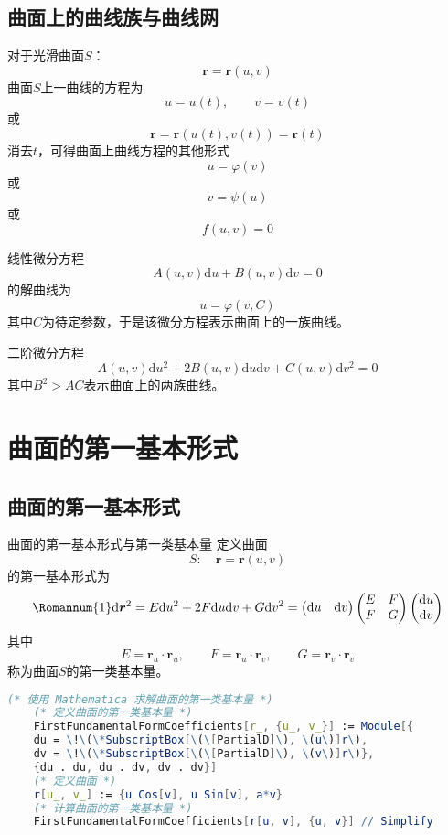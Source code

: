 \documentclass[lang = cn, scheme = chinese, thmcnt = section]{elegantbook}
\newcommand{\bs}{\boldsymbol}          %
\newcommand{\dd}{\mathrm{d}}           %
\begin{document}
\subsection{曲面上的曲线族与曲线网}

对于光滑曲面$S$：%
$$
\bs{r}=\bs{r}(u,v)
$$
曲面$ S $上一曲线的方程为%
$$
u=u(t),\qquad 
v=v(t)
$$
或%
$$
\bs{r}=\bs{r}(u(t),v(t))=\bs{r}(t)
$$
消去$t$，可得曲面上曲线方程的其他形式%
$$
u=\varphi(v)
$$
或%
$$
v=\psi(u)
$$
或%
$$
f(u,v)=0
$$

线性微分方程%
$$
A(u,v)\dd u+B(u,v)\dd v=0
$$
的解曲线为%
$$
u=\varphi(v,C)
$$
其中$C$为待定参数，于是该微分方程表示曲面上的一族曲线。

二阶微分方程%
$$
A(u,v)\dd u^2+2B(u,v)\dd u \dd v+C(u,v)\dd v^2=0
$$
其中$B^2>AC$表示曲面上的两族曲线。

\section{曲面的第一基本形式}

\subsection{曲面的第一基本形式}

\begin{definition}{曲面的第一基本形式与第一类基本量}
	定义曲面
	$$
	S:\quad \bs{r}=\bs{r}(u,v)
	$$
	的第一基本形式为%
	$$
	{\rm\Romannum{1}}
	\dd \bs{r}^2
	=E\dd u^2+2F\dd u\dd v+G\dd v^2=
	\begin{pmatrix}
		\dd u & \dd v
	\end{pmatrix}
	\begin{pmatrix}
		E & F\\
		F & G
	\end{pmatrix}
	\begin{pmatrix}
		\dd u \\ \dd v
	\end{pmatrix}
	$$
	其中%
	$$
	E=\bs{r}_u\cdot\bs{r}_u,\qquad 
	F=\bs{r}_u\cdot\bs{r}_v,\qquad 
	G=\bs{r}_v\cdot\bs{r}_v
	$$
	称为曲面$S$的第一类基本量。
\end{definition}

\begin{lstlisting}[language = Mathematica]
	(* 使用 Mathematica 求解曲面的第一类基本量 *)
	(* 定义曲面的第一类基本量 *)
	FirstFundamentalFormCoefficients[r_, {u_, v_}] := Module[{
	du = \!\(\*SubscriptBox[\(\[PartialD]\), \(u\)]r\), 
	dv = \!\(\*SubscriptBox[\(\[PartialD]\), \(v\)]r\)}, 
	{du . du, du . dv, dv . dv}]
	(* 定义曲面 *)
	r[u_, v_] := {u Cos[v], u Sin[v], a*v}
	(* 计算曲面的第一类基本量 *)
	FirstFundamentalFormCoefficients[r[u, v], {u, v}] // Simplify
\end{lstlisting}
\end{document}
